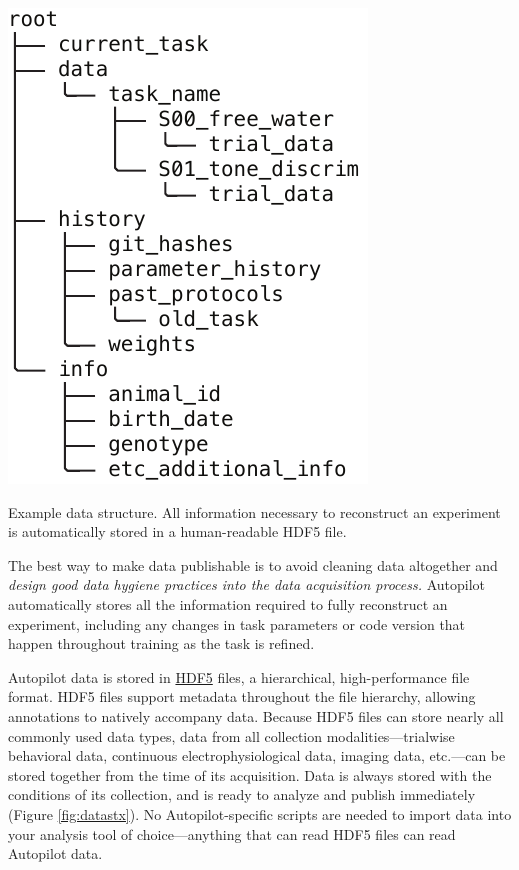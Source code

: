 \documentclass[nohyper, justified, notitlepage, marginals=raggedright,twoside=false,debug]{tufte-autopilot}
\begin{document}
\begin{marginfigure}[0.5cm]
\includegraphics[]{figures/side_16_data.pdf}
\caption{Example data structure. All information necessary to reconstruct an experiment is automatically stored in a human-readable HDF5 file.}
\label{fig:datastx}
\end{marginfigure}

The best way to make data publishable is to avoid cleaning data altogether and \textit{design good data hygiene practices into the data acquisition process.} Autopilot automatically stores all the information required to fully reconstruct an experiment, including any changes in task parameters or code version that happen throughout training as the task is refined.

Autopilot data is stored in \href{https://support.hdfgroup.org/HDF5/whatishdf5.html}{HDF5} files, a hierarchical, high-performance file format. HDF5 files support metadata throughout the file hierarchy, allowing annotations to natively accompany data. Because HDF5 files can store nearly all commonly used data types, data from all collection modalities---trialwise behavioral data, continuous electrophysiological data, imaging data, etc.---can be stored together from the time of its acquisition. Data is always stored with the conditions of its collection, and is ready to analyze and publish immediately (Figure \ref{fig:datastx}). No Autopilot-specific scripts are needed to import data into your analysis tool of choice---anything that can read HDF5 files can read Autopilot data. 
\end{document}
